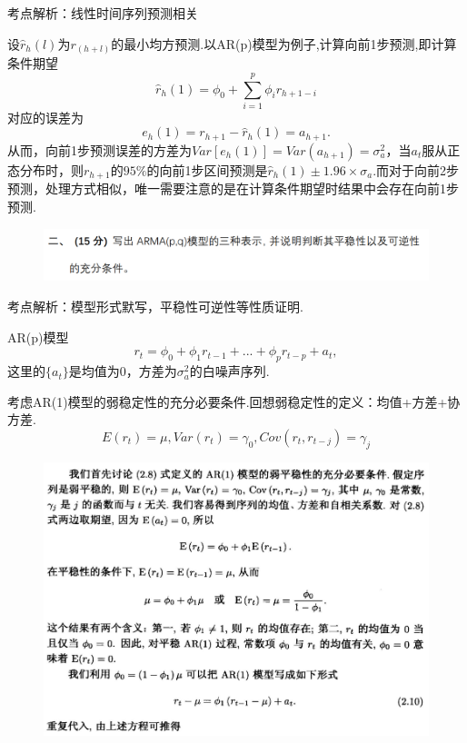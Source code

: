 \documentclass[UTF8]{ctexart}
\begin{document}
考点解析：线性时间序列预测相关

\hspace*{\fill}

设$\hat{r}_h(l)$为$r_(h+l)$的最小均方预测.以AR(p)模型为例子,计算向前1步预测,即计算条件期望\[\hat{r}_h(1)=\phi_0+\sum_{i=1}^{p}\phi_i r_{h+1-i}\]对应的误差为\[e_h(1)=r_{h+1}-\hat{r}_h(1)=a_{h+1}.\]从而，向前1步预测误差的方差为$Var[e_h(1)]=Var(a_{h+1})=\sigma_a^2$，当$a_t$服从正态分布时，则$r_{h+1}$的$95\%$的向前1步区间预测是$\hat{r}_h(1)\pm 1.96 \times \sigma_a.$而对于向前2步预测，处理方式相似，唯一需要注意的是在计算条件期望时结果中会存在向前1步预测.

\hspace*{\fill}

     \begin{figure}[h]
         \centering
         \includegraphics[scale=0.35]{images2.png}
     \end{figure}

考点解析：模型形式默写，平稳性可逆性等性质证明.

\hspace*{\fill}

AR(p)模型\[r_t=\phi_0+\phi_1 r_{t-1}+...+\phi_p r_{t-p}+a_t,\]这里的$\{a_t\}$是均值为0，方差为$\sigma_a^2$的白噪声序列.

\hspace*{\fill}

考虑AR(1)模型的弱稳定性的充分必要条件.回想弱稳定性的定义：均值+方差+协方差.\[E(r_t)=\mu,Var(r_t)=\gamma_0,Cov(r_t,r_{t-j})=\gamma_j\]

     \begin{figure}[h]
         \centering
         \includegraphics[scale=0.28]{images3.png}
     \end{figure}
\end{document}
